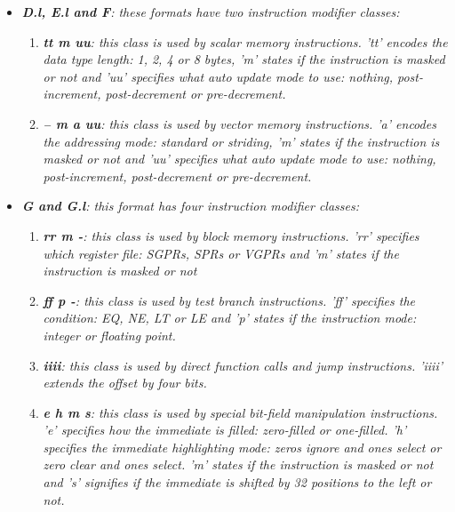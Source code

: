 \begin{itemize}
\begin{enumerate}
                    \end{enumerate}

                \item \textit{\textbf{D.l, E.l and F}: these formats have two instruction modifier classes:}

                    \begin{enumerate}

                        \item \textit{\textbf{tt m uu}: this class is used by scalar memory instructions. 'tt' encodes the data type length: 1, 2, 4 or 8 bytes, 'm' states if the instruction is masked or not and 'uu' specifies what auto update mode to use: nothing, post-increment, post-decrement or pre-decrement.}

                        \item \textit{\textbf{-- m a uu}: this class is used by vector memory instructions. 'a' encodes the addressing mode: standard or striding, 'm' states if the instruction is masked or not and 'uu' specifies what auto update mode to use: nothing, post-increment, post-decrement or pre-decrement.}

                    \end{enumerate}

                \item \textit{\textbf{G and G.l}: this format has four instruction modifier classes:}

                    \begin{enumerate}

                        \item \textit{\textbf{rr m -}: this class is used by block memory instructions. 'rr' specifies which register file: SGPRs, SPRs or VGPRs and 'm' states if the instruction is masked or not}

                        \item \textit{\textbf{ff p -}: this class is used by test branch instructions. 'ff' specifies the condition: EQ, NE, LT or LE and 'p' states if the instruction mode: integer or floating point.}

                        \item \textit{\textbf{iiii}: this class is used by direct function calls and jump instructions. 'iiii' extends the offset by four bits.}

                        \item \textit{\textbf{e h m s}: this class is used by special bit-field manipulation instructions. 'e' specifies how the immediate is filled: zero-filled or one-filled. 'h' specifies the immediate highlighting mode: zeros ignore and ones select or zero clear and ones select. 'm' states if the instruction is masked or not and 's' signifies if the immediate is shifted by 32 positions to the left or not.}


\end{enumerate}
\end{itemize}
